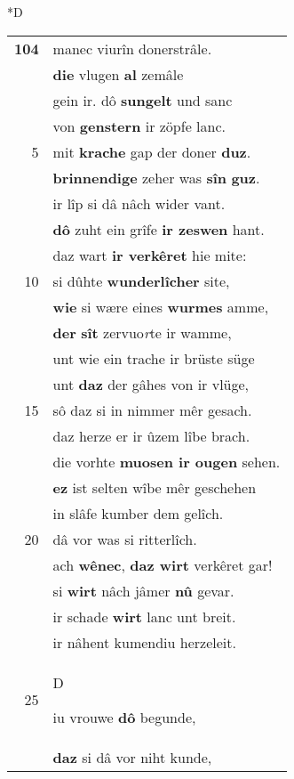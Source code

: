 \documentclass[8pt,a4paper,notitlepage]{article}
\begin{document}
\begin{table}[ht]
\begin{minipage}[t]{0.5\linewidth}
\small
\begin{center}*D
\end{center}
\begin{tabular}{rl}
\textbf{104} & manec viurîn donerstrâle.\\ 
 & \textbf{die} vlugen \textbf{al} zemâle\\ 
 & gein ir. dô \textbf{sungelt} und sanc\\ 
 & von \textbf{genstern} ir zöpfe lanc.\\ 
5 & mit \textbf{krache} gap der doner \textbf{duz}.\\ 
 & \textbf{brinnendige} zeher was \textbf{sîn} \textbf{guz}.\\ 
 & ir lîp si dâ nâch wider vant.\\ 
 & \textbf{dô} zuht ein grîfe \textbf{ir zeswen} hant.\\ 
 & daz wart \textbf{ir verkêret} hie mite:\\ 
10 & si dûhte \textbf{wunderlîcher} site,\\ 
 & \textbf{wie} si wære eines \textbf{wurmes} amme,\\ 
 & \textbf{der} \textbf{sît} zervuo\textit{r}te ir wamme,\\ 
 & unt wie ein trache ir brüste süge\\ 
 & unt \textbf{daz} der gâhes von ir vlüge,\\ 
15 & sô daz si in nimmer mêr gesach.\\ 
 & daz herze er ir ûzem lîbe brach.\\ 
 & die vorhte \textbf{muosen ir ougen} sehen.\\ 
 & \textbf{ez} ist selten wîbe mêr geschehen\\ 
 & in slâfe kumber dem gelîch.\\ 
20 & dâ vor was si ritterlîch.\\ 
 & ach \textbf{wênec}, \textbf{daz wirt} verkêret gar!\\ 
 & si \textbf{wirt} nâch jâmer \textbf{nû} gevar.\\ 
 & ir schade \textbf{wirt} lanc unt breit.\\ 
 & ir nâhent kumendiu herzeleit.\\ 
25 & \begin{large}D\end{large}iu vrouwe \textbf{dô} begunde,\\ 
 & \textbf{daz} si dâ vor niht kunde,\\ 

\end{tabular}
\end{minipage}
\end{table}
\end{document}
